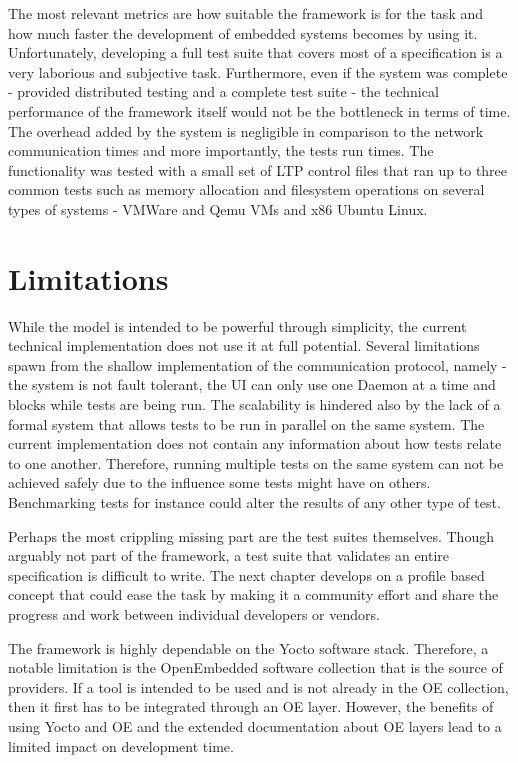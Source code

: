 The most relevant metrics are how suitable the framework is for the task and how much faster the development of embedded systems becomes by using it. Unfortunately, developing a full test suite that covers most of a specification is a very laborious and subjective task. Furthermore, even if the system was complete - provided distributed testing and a complete test suite - the technical performance of the framework itself would not be the bottleneck in terms of time. The overhead added by the system is negligible in comparison to the network communication times and more importantly, the tests run times. The functionality was tested with a small set of LTP control files that ran up to three common tests such as memory allocation and filesystem operations on several types of systems - VMWare and Qemu VMs and x86 Ubuntu Linux.

\section{Limitations}

While the model is intended to be powerful through simplicity, the current technical implementation does not use it at full potential. Several limitations spawn from the shallow implementation of the communication protocol, namely - the system is not fault tolerant, the UI can only use one Daemon at a time and blocks while tests are being run. The scalability is hindered also by the lack of a formal system that allows tests to be run in parallel on the same system. The current implementation does not contain any information about how tests relate to one another. Therefore, running multiple tests on the same system can not be achieved safely due to the influence some tests might have on others. Benchmarking tests for instance could alter the results of any other type of test.

Perhaps the most crippling missing part are the test suites themselves. Though arguably not part of the framework, a test suite that validates an entire specification is difficult to write. The next chapter develops on a profile based concept that could ease the task by making it a community effort and share the progress and work between individual developers or vendors.

The framework is highly dependable on the Yocto software stack. Therefore, a notable limitation is the OpenEmbedded software collection that is the source of providers. If a tool is intended to be used and is not already in the OE collection, then it first has to be integrated through an OE layer. However, the benefits of using Yocto and OE and the extended documentation about OE layers lead to a limited impact on development time.
